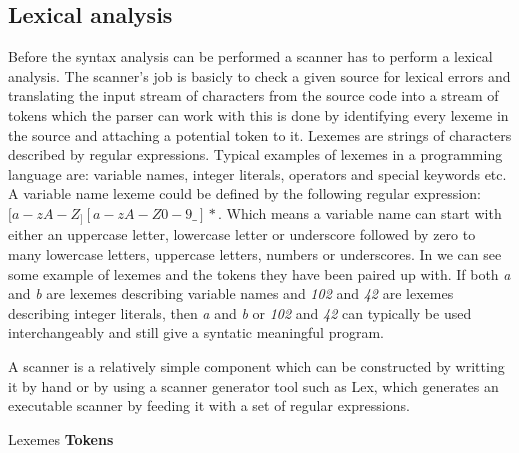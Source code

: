 \subsection{Lexical analysis}
\label{sec:lexicalanalysis}
Before the syntax analysis can be performed a scanner has to perform a lexical analysis. The scanner's job is basicly to check a given source for lexical errors and translating the input stream of characters from the source code into a stream of tokens which the parser can work with \cite[p. 57]{fischer2009} this is done by identifying every lexeme in the source and attaching a potential token to it. Lexemes are strings of characters described by regular expressions. Typical examples of lexemes in a programming language are: variable names, integer literals, operators and special keywords etc. A variable name lexeme could be defined by the following regular expression: $[a-zA-Z_][a-zA-Z0-9\_]*$. Which means a variable name can start with either an uppercase letter, lowercase letter or underscore followed by zero to many lowercase letters, uppercase letters, numbers or underscores. In  we can see some example of lexemes and the tokens they have been paired up with. If both \textit{a} and \textit{b} are lexemes describing variable names and \textit{102} and \textit{42} are lexemes describing integer literals, then \textit{a} and \textit{b} or \textit{102} and \textit{42} can typically be used interchangeably and still give a syntatic meaningful program. 

A scanner is a relatively simple component which can be constructed by writting it by hand or by using a scanner generator tool such as Lex, which generates an executable scanner by feeding it with a set of regular expressions. 

		    {               }
{Lexemes   }{\textbf{Tokens}} {
}